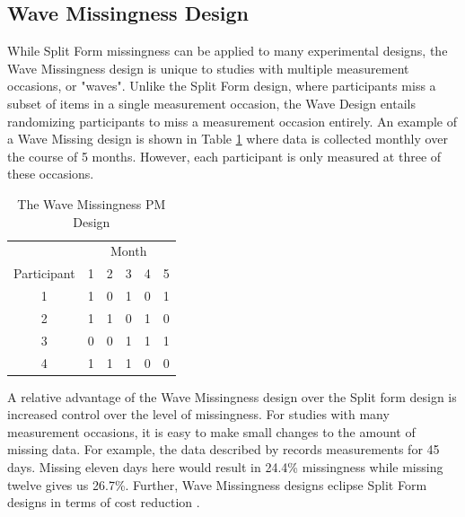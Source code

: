 \documentclass{svjour3}\usepackage[]{graphicx}\usepackage[]{color}
\begin{document}
\subsection{Wave Missingness Design}
\label{sec:1.2}
While Split Form missingness can be applied to many experimental designs, the Wave Missingness design \citep{little2013planned} is unique to studies with multiple measurement occasions, or "waves". Unlike the Split Form design, where participants miss a subset of items in a single measurement occasion, the Wave Design entails randomizing participants to miss a measurement occasion entirely. An example of a Wave Missing design is shown in Table \ref{tab:table11} where data is collected monthly over the course of 5 months. However, each participant is only measured at three of these occasions. \par

\begin{table}[b!]
	\centering
	\caption{The Wave Missingness PM Design}
	\label{tab:table11}
	\setlength{\tabcolsep}{0.75cm}
	\begin{tabular}{c|ccccc}
		\toprule
		& \multicolumn{5}{c}{Month} \\
		Participant & 1 & 2 & 3 & 4 & 5 \\
		\midrule
		1 & 1 & 0 & 1 & 0 & 1 \\
		2 & 1 & 1 & 0 & 1 & 0 \\
		3 & 0 & 0 & 1 & 1 & 1 \\
		4 & 1 & 1 & 1 & 0 & 0 \\
		\bottomrule
	\end{tabular}
\end{table}

A relative advantage of the Wave Missingness design over the Split form design is increased control over the level of missingness. For studies with many measurement occasions, it is easy to make small changes to the amount of missing data. For example, the data described by \citet{pellowski2016alcohol} records measurements for 45 days. Missing eleven days here would result in 24.4\% missingness while missing twelve gives us 26.7\%. Further, Wave Missingness designs eclipse Split Form designs in terms of cost reduction \citep{little2013planned}. \par
\end{document}
